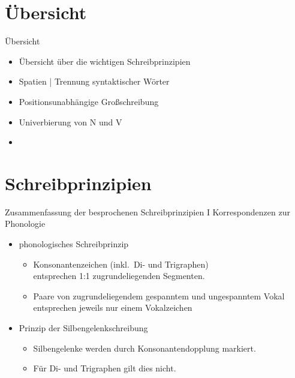 \section{Übersicht}

\begin{frame}
  {Übersicht}
  \onslide<+->
  \begin{itemize}[<+->]
    \item Übersicht über die wichtigen \alert{Schreibprinzipien}
      \Zeile
    \item \alert{Spatien} | Trennung syntaktischer Wörter
      \Zeile
    \item \alert{Positionsunabhängige Großschreibung}
      \Zeile
    \item Univerbierung von N und V
      \Zeile
    \item \citet{Schaefer2018b}
  \end{itemize}
\end{frame}



\section[Prinzipien]{Schreibprinzipien}

\begin{frame}
  {Zusammenfassung der besprochenen Schreibprinzipien I}
  \pause
  Korrespondenzen zur Phonologie\\
  \Zeile
  \pause
  \begin{itemize}[<+->]
    \item \alert{phonologisches Schreibprinzip}
      \begin{itemize}[<+->]
        \item Konsonantenzeichen (inkl.\ Di- und Trigraphen)\\
          entsprechen 1:1 zugrundeliegenden Segmenten.
        \item Paare von zugrundeliegendem gespanntem und ungespanntem Vokal\\
          entsprechen jeweils nur einem Vokalzeichen 
      \end{itemize}
     \Zeile 
    \item \alert{Prinzip der Silbengelenkschreibung}
      \begin{itemize}[<+->]
        \item Silbengelenke werden durch Konsonantendopplung markiert.
        \item Für Di- und Trigraphen gilt dies nicht.
      \end{itemize}
  \end{itemize}
\end{frame}

